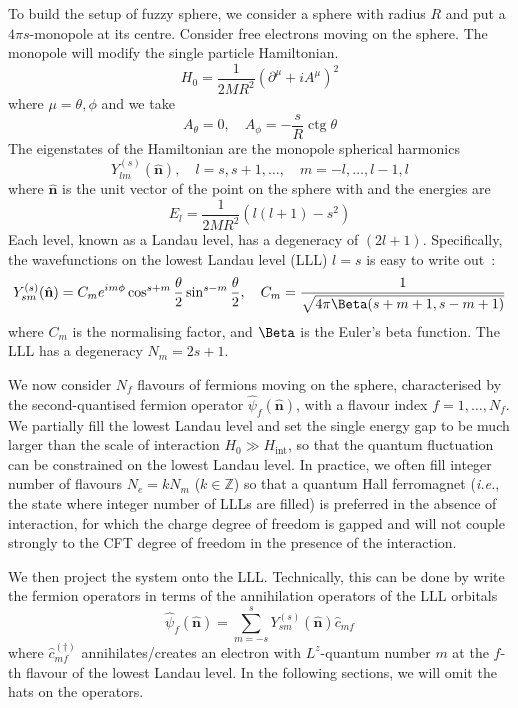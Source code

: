 \documentclass{timesjhep}
\begin{document}
To build the setup of fuzzy sphere, we consider a sphere with radius $R$ and put a $4\pi s$-monopole at its centre. Consider free electrons moving on the sphere. The monopole will modify the single particle Hamiltonian. \begin{equation}
    H_0=\frac{1}{2MR^2}(\partial^\mu+iA^\mu)^2
\end{equation} where $\mu=\theta,\phi$ and we take 
\begin{equation}
    A_\theta=0,\quad A_\phi=-\frac{s}{R}\operatorname{ctg}\theta
\end{equation}
The eigenstates of the Hamiltonian are the monopole spherical harmonics 
\begin{equation}
    Y_{lm}^{(s)}(\hat{\mathbf{n}}),\quad l=s,s+1,\dots,\quad m=-l,\dots,l-1,l
\end{equation}
where $\hat{\mathbf{n}}$ is the unit vector of the point on the sphere with and the energies are
\begin{equation}
    E_l=\frac{1}{2MR^2}(l(l+1)-s^2)
\end{equation}
Each level, known as a Landau level, has a degeneracy of $(2l+1)$. Specifically, the wavefunctions on the lowest Landau level (LLL) $l=s$ is easy to write out~: 
\begin{equation}
    Y_{sm}^{(s)}(\hat{\mathbf{n}})=C_me^{im\phi}\cos^{s+m}\frac{\theta}{2}\sin^{s-m}\frac{\theta}{2},\quad C_m=\frac{1}{{\sqrt{4\pi\Beta(s+m+1,s-m+1)}}}
\end{equation}
where $C_m$ is the normalising factor, and $\Beta$ is the Euler's beta function. The LLL has a degeneracy $N_m=2s+1$. 

We now consider $N_f$ flavours of fermions moving on the sphere, characterised by the second-quantised fermion operator $\hat{\psi}_f(\hat{\mathbf{n}})$, with a flavour index $f=1,\dots,N_f$. We partially fill the lowest Landau level and set the single energy gap to be much larger than the scale of interaction $H_0\gg H_\mathrm{int}$, so that the quantum fluctuation can be constrained on the lowest Landau level. In practice, we often fill integer number of flavours $N_e=kN_m$ ($k\in\mathbb{Z}$) so that a quantum Hall ferromagnet (\textit{i.e.}, the state where integer number of LLLs are filled) is preferred in the absence of interaction, for which the charge degree of freedom is gapped and will not couple strongly to the CFT degree of freedom in the presence of the interaction. 

We then project the system onto the LLL. Technically, this can be done by write the fermion operators in terms of the annihilation operators of the LLL orbitals
\begin{equation}
    \hat{\psi}_f(\hat{\mathbf{n}})=\sum_{m=-s}^s Y^{(s)}_{sm}(\hat{\mathbf{n}})\hat{c}_{mf}
\end{equation} 
where $\hat{c}^{(\dagger)}_{mf}$ annihilates/creates an electron with $L^z$-quantum number $m$ at the $f$-th flavour of the lowest Landau level. In the following sections, we will omit the hats on the operators. 
\end{document}
